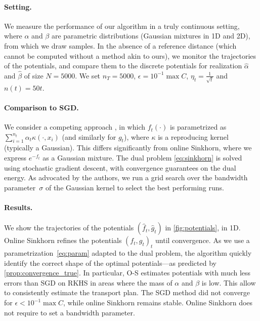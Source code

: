 \paragraph{Setting.}We measure the performance of our algorithm in a truly continuous
setting, where $\alpha$ and $\beta$ are  parametric distributions (Gaussian
mixtures in 1D and 2D), from which we draw samples. In the absence of a reference distance (which cannot be computed
without a method akin to ours), we monitor the
trajectories of the potentials, and compare them to the discrete potentials for
realization $\hat \alpha$ and $\hat \beta$ of size $N=5000$. We set $n_T = 5000$,
$\epsilon = 10^{-1} \max C$, $\eta_t = \frac{1}{\sqrt{t}}$ and $n(t) = 50 t$.

\paragraph{Comparison to SGD.}\label{sec:compare}
%
We consider a competing approach \citep{2016-genevay-nips}, in which $f_t(\cdot)$
is parametrized as $\sum_{i=1}^{n_t} \alpha_t \kappa(\cdot, x_i)$ (and similarly for
$g_t$), where $\kappa$ is a reproducing kernel (typically a Gaussian). This
differs significantly from online Sinkhorn, where we express $e^{-f_t}$ as a
Gaussian mixture. The dual problem \eqref{eq:sinkhorn} is solved using
stochastic gradient descent, with convergence guarantees on the dual energy.  As
advocated by the authors, we run a grid search over the bandwidth
parameter~$\sigma$ of the Gaussian kernel to select the best performing runs. 

\paragraph{Results.} We show the trajectories of the potentials $(\hat f_t, \hat g_t)$ in
\autoref{fig:potentials}, in 1D. Online Sinkhorn refines the potentials $(f_t, g_t)_t$
until convergence. As we use a parametrization~\eqref{eq:param}
adapted to the dual problem, the algorithm quickly identify the correct shape of
the optimal potentials---as predicted by \autoref{prop:convergence_true}. In
particular, O-S estimates potentials with much less errors than SGD on RKHS in
areas where the mass of $\alpha$ and $\beta$ is low. This allow to consistently estimate the transport plan. The SGD method did not converge
for $\epsilon < 10^{-1} \max C$, while online Sinkhorn remains stable. Online
Sinkhorn does not require to set a bandwidth parameter.



